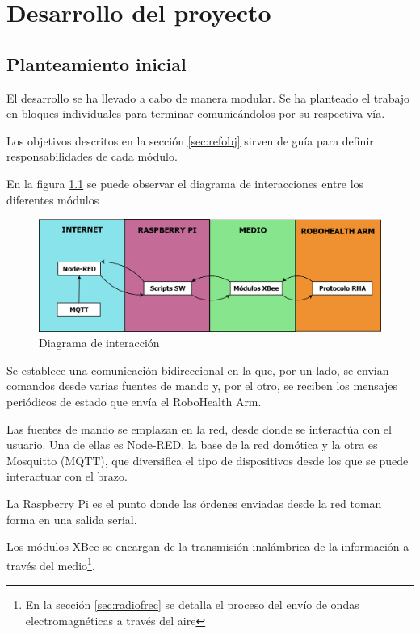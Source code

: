
\chapter{Desarrollo del proyecto}

\section{Planteamiento inicial}

El desarrollo se ha llevado a cabo de manera modular. Se ha planteado el trabajo en bloques individuales para terminar comunicándolos por su respectiva vía.

Los objetivos descritos en la sección \ref{sec:refobj} sirven de guía para definir responsabilidades de cada módulo.

En la figura \ref{fig:diainteraccion} se puede observar el diagrama de interacciones entre los diferentes módulos

\begin{figure}[tb]
\centering
\includegraphics[width=1\textwidth]{figuras/DiaInteraccion.png}
\caption{Diagrama de interacción}
\label{fig:diainteraccion}
\end{figure}

Se establece una comunicación bidireccional en la que, por un lado, se envían comandos desde varias fuentes de mando y, por el otro, se reciben los mensajes periódicos de estado que envía el RoboHealth Arm.

Las fuentes de mando se emplazan en la red, desde donde se interactúa con el usuario. Una de ellas es Node-RED, la base de la red domótica y la otra es Mosquitto (MQTT), que diversifica el tipo de dispositivos desde los que se puede interactuar con el brazo.

La Raspberry Pi es el punto donde las órdenes enviadas desde la red toman forma en una salida serial.

Los módulos XBee se encargan de la transmisión inalámbrica de la información a través del medio\footnote{En la sección \ref{sec:radiofrec} se detalla el proceso del envío de ondas electromagnéticas a través del aire}.

